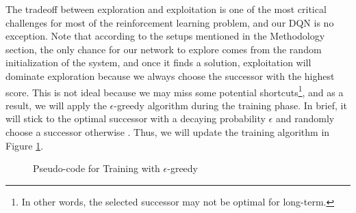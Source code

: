 \documentclass[letterpaper]{article} %
\makeatletter
\newcommand{\removelatexerror}{\let\@latex@error\@gobble}
\makeatother
\begin{document}
\begin{itemize}
\begin{enumerate}
    The tradeoff between exploration and exploitation is one of the most critical challenges for most of the reinforcement learning problem, and our DQN is no exception. Note that according to the setups mentioned in the Methodology section, the only chance for our network to explore comes from the random initialization of the system, and once it finds a solution, exploitation will dominate exploration because we always choose the successor with the highest score. This is not ideal because we may miss some potential shortcuts\footnote{In other words, the selected successor may not be optimal for long-term.}, and as a result, we will apply the $\epsilon$-greedy algorithm during the training phase. In brief, it will stick to the optimal successor with a decaying probability $\epsilon$ and randomly choose a successor otherwise \cite{Tokic_2010}. Thus, we will update the training algorithm in Figure \ref{fig:code2}.
  
    \begin{figure}[h!]
      \centering
      \begin{minipage}{.95\linewidth}
        \removelatexerror%
        \begin{algorithm}[H]
          \DontPrintSemicolon
        \end{algorithm}
      \end{minipage}
      \caption{Pseudo-code for Training with $\epsilon$-greedy}
      \label{fig:code2}
    \end{figure}


\end{enumerate}
\end{itemize}
\end{document}
